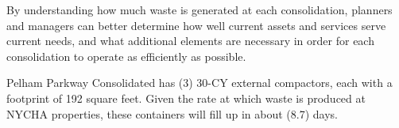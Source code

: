 
    By understanding how much waste is generated at each consolidation, planners and managers
    can better determine how well current assets and services serve current needs, and what additional 
    elements are necessary in order for each consolidation to operate as efficiently as possible. 

    Pelham Parkway Consolidated has (3) 30-CY external compactors, each with a footprint of 192 square feet. Given the rate at which waste is produced at NYCHA properties, these containers will fill
    up in about (8.7) days.